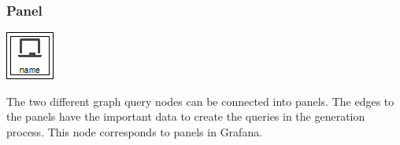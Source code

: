 \subsubsection{Panel}
\noindent\begin{minipage}{0.15\textwidth}%
	\includegraphics[width=\linewidth]{assets/images/panel}
\end{minipage}%
\hfill%
\begin{minipage}{0.8\textwidth}
	The two different graph query nodes can be connected into panels. The edges to the panels have the important data to create the queries in the generation process. This node corresponds to panels in Grafana. 
\end{minipage}

